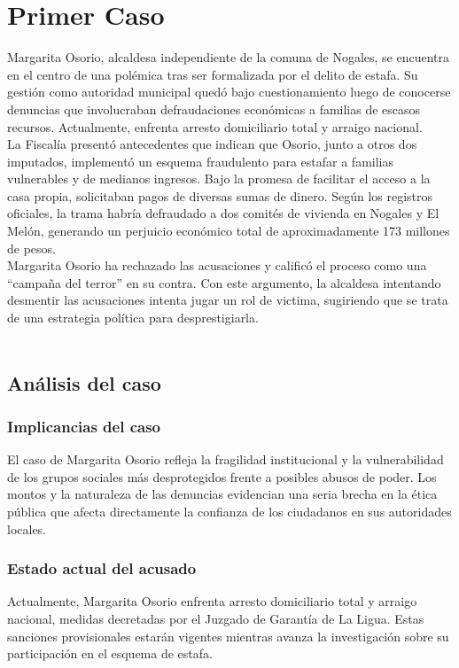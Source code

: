\documentclass[letter,12pt]{article}
\begin{document}
	\section{Primer Caso\\}
	Margarita Osorio, alcaldesa independiente de la comuna de Nogales, se encuentra en el centro de una polémica tras ser formalizada por el delito de estafa. Su gestión como autoridad municipal quedó bajo cuestionamiento luego de conocerse denuncias que involucraban defraudaciones económicas a familias de escasos recursos. Actualmente, enfrenta arresto domiciliario total y arraigo nacional.\\
	La Fiscalía presentó antecedentes que indican que Osorio, junto a otros dos imputados, implementó un esquema fraudulento para estafar a familias vulnerables y de medianos ingresos. Bajo la promesa de facilitar el acceso a la casa propia, solicitaban pagos de diversas sumas de dinero. Según los registros oficiales, la trama habría defraudado a dos comités de vivienda en Nogales y El Melón, generando un perjuicio económico total de aproximadamente 173 millones de pesos.\\
	Margarita Osorio ha rechazado las acusaciones y calificó el proceso como una “campaña del terror” en su contra. Con este argumento, la alcaldesa intentando desmentir las acusaciones intenta jugar un rol de victima, sugiriendo que se trata de una estrategia política para desprestigiarla.\\\\
	
	\subsection{Análisis del caso\\}
	\subsubsection{Implicancias del caso}
	El caso de Margarita Osorio refleja la fragilidad institucional y la vulnerabilidad de los grupos sociales más desprotegidos frente a posibles abusos de poder. Los montos y la naturaleza de las denuncias evidencian una seria brecha en la ética pública que afecta directamente la confianza de los ciudadanos en sus autoridades locales.\\
	
	\subsubsection{Estado actual del acusado}
	Actualmente, Margarita Osorio enfrenta arresto domiciliario total y arraigo nacional, medidas decretadas por el Juzgado de Garantía de La Ligua. Estas sanciones provisionales estarán vigentes mientras avanza la investigación sobre su participación en el esquema de estafa.\\
	
\end{document}
